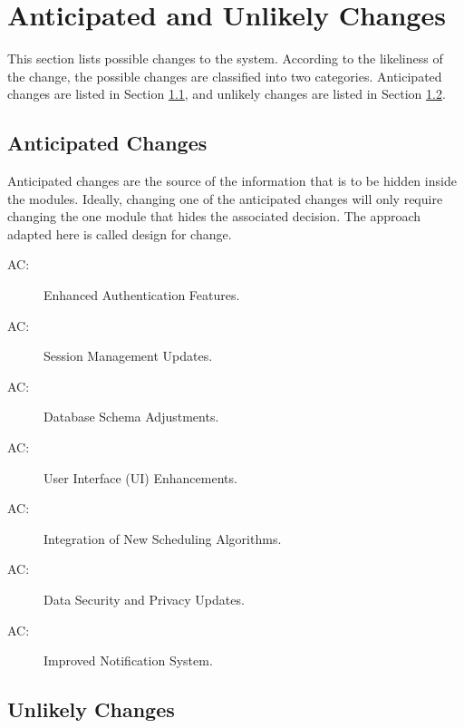 \documentclass[12pt, titlepage]{article}
\newcounter{acnum}
\newcommand{\actheacnum}{AC\theacnum}
\begin{document}
\section{Anticipated and Unlikely Changes} \label{SecChange}

This section lists possible changes to the system. According to the likeliness
of the change, the possible changes are classified into two
categories. Anticipated changes are listed in Section \ref{SecAchange}, and
unlikely changes are listed in Section \ref{SecUchange}.

\subsection{Anticipated Changes} \label{SecAchange}

Anticipated changes are the source of the information that is to be hidden
inside the modules. Ideally, changing one of the anticipated changes will only
require changing the one module that hides the associated decision. The approach
adapted here is called design for
change.

\begin{description}
\item[ \actheacnum \label{acEnhancedAuth}:] Enhanced Authentication Features.
\item[ \actheacnum \label{acSessionUpdate}:] Session Management Updates.
\item[ \actheacnum \label{acDbSchema}:] Database Schema Adjustments.
\item[ \actheacnum \label{acUIEnhance}:] User Interface (UI) Enhancements.
\item[ \actheacnum \label{acNewAlg}:] Integration of New Scheduling Algorithms.
\item[ \actheacnum \label{acDataSecurity}:] Data Security and Privacy Updates.
\item[ \actheacnum \label{acNotifSystem}:] Improved Notification System. 
\end{description}


\subsection{Unlikely Changes} \label{SecUchange}
\end{document}
